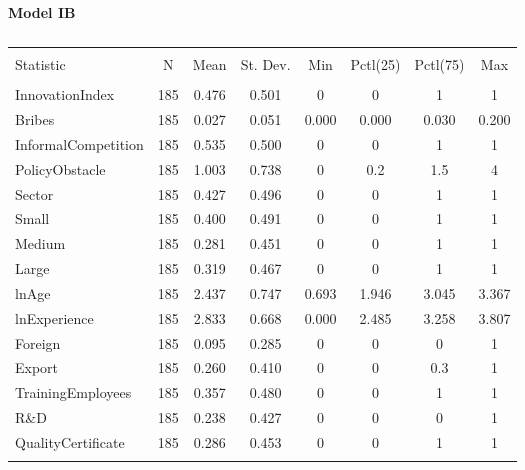 \textbf{\Large Model IB}
\begin{table}[H] \centering 
  \caption*{} 
\begin{tabular}{@{\extracolsep{5pt}}lccccccc} 
\\[-1.8ex]\hline 
\hline \\[-1.8ex] 
Statistic & \multicolumn{1}{c}{N} & \multicolumn{1}{c}{Mean} & \multicolumn{1}{c}{St. Dev.} & \multicolumn{1}{c}{Min} & \multicolumn{1}{c}{Pctl(25)} & \multicolumn{1}{c}{Pctl(75)} & \multicolumn{1}{c}{Max} \\ 
\hline \\[-1.8ex] 
InnovationIndex & 185 & 0.476 & 0.501 & 0 & 0 & 1 & 1 \\ 
Bribes & 185 & 0.027 & 0.051 & 0.000 & 0.000 & 0.030 & 0.200 \\ 
InformalCompetition & 185 & 0.535 & 0.500 & 0 & 0 & 1 & 1 \\ 
PolicyObstacle & 185 & 1.003 & 0.738 & 0 & 0.2 & 1.5 & 4 \\ 
Sector & 185 & 0.427 & 0.496 & 0 & 0 & 1 & 1 \\ 
Small & 185 & 0.400 & 0.491 & 0 & 0 & 1 & 1 \\ 
Medium & 185 & 0.281 & 0.451 & 0 & 0 & 1 & 1 \\ 
Large & 185 & 0.319 & 0.467 & 0 & 0 & 1 & 1 \\ 
lnAge & 185 & 2.437 & 0.747 & 0.693 & 1.946 & 3.045 & 3.367 \\ 
lnExperience & 185 & 2.833 & 0.668 & 0.000 & 2.485 & 3.258 & 3.807 \\ 
Foreign & 185 & 0.095 & 0.285 & 0 & 0 & 0 & 1 \\ 
Export & 185 & 0.260 & 0.410 & 0 & 0 & 0.3 & 1 \\ 
TrainingEmployees & 185 & 0.357 & 0.480 & 0 & 0 & 1 & 1 \\ 
R\&D & 185 & 0.238 & 0.427 & 0 & 0 & 0 & 1 \\ 
QualityCertificate & 185 & 0.286 & 0.453 & 0 & 0 & 1 & 1 \\ 
\hline \\[-1.8ex] 
\end{tabular}
\end{table} 

